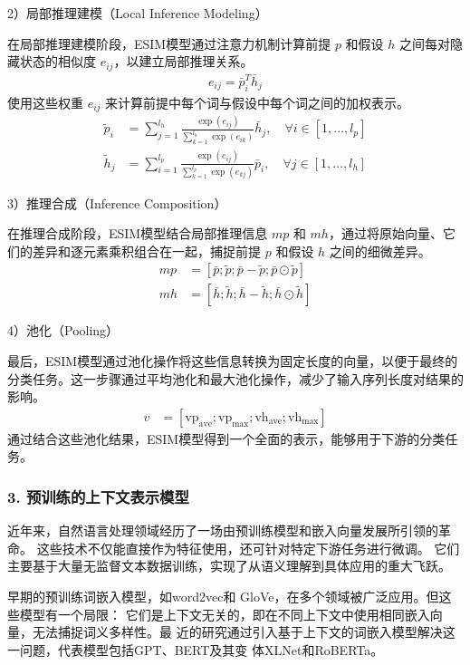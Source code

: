 2）局部推理建模（Local Inference Modeling）

在局部推理建模阶段，ESIM模型通过注意力机制计算前提 \( p \) 和假设 \( h \) 之间每对隐藏状态的相似度 \( e_{ij} \)，以建立局部推理关系。
\begin{align}
    e_{ij} = \bar{p}_i^T \bar{h}_j
\end{align}
使用这些权重 \( e_{ij} \) 来计算前提中每个词与假设中每个词之间的加权表示。
\begin{align}
    \tilde{p}_i &= \sum_{j=1}^{l_h} \frac{\exp(e_{ij})}{\sum_{k=1}^{l_h} \exp(e_{ik})} \bar{h}_j, \quad \forall i \in [1, \ldots, l_p] \\
    \tilde{h}_j &= \sum_{i=1}^{l_p} \frac{\exp(e_{ij})}{\sum_{k=1}^{l_p} \exp(e_{kj})} \bar{p}_i, \quad \forall j \in [1, \ldots, l_h]
\end{align}

3）推理合成（Inference Composition）

在推理合成阶段，ESIM模型结合局部推理信息 \( mp \) 和 \( mh \)，通过将原始向量、它们的差异和逐元素乘积组合在一起，捕捉前提 \( p \) 和假设 \( h \) 之间的细微差异。
\begin{align}
    mp &= [\bar{p}; \tilde{p}; \bar{p} - \tilde{p}; \bar{p} \odot \tilde{p}] \\
    mh &= [\bar{h}; \tilde{h}; \bar{h} - \tilde{h}; \bar{h} \odot \tilde{h}]
\end{align}

4）池化（Pooling）

最后，ESIM模型通过池化操作将这些信息转换为固定长度的向量，以便于最终的分类任务。这一步骤通过平均池化和最大池化操作，减少了输入序列长度对结果的影响。
\begin{align}
  v &= [\text{vp}_{\text{ave}}; \text{vp}_{\text{max}}; \text{vh}_{\text{ave}}; \text{vh}_{\text{max}}]
\end{align}
通过结合这些池化结果，ESIM模型得到一个全面的表示，能够用于下游的分类任务。

\subsubsection*{3. 预训练的上下文表示模型}
近年来，自然语言处理领域经历了一场由预训练模型和嵌入向量发展所引领的革命。
这些技术不仅能直接作为特征使用，还可针对特定下游任务进行微调。
它们主要基于大量无监督文本数据训练，实现了从语义理解到具体应用的重大飞跃。

早期的预训练词嵌入模型，如word2vec\cite{mikolov2013distributed}和
GloVe\cite{pennington2014glove}，在多个领域被广泛应用。但这些模型有一个局限：
它们是上下文无关的，即在不同上下文中使用相同嵌入向量，无法捕捉词义多样性。最
近的研究通过引入基于上下文的词嵌入模型解决这一问题，代表模型包括GPT、BERT及其变
体XLNet和RoBERTa。

